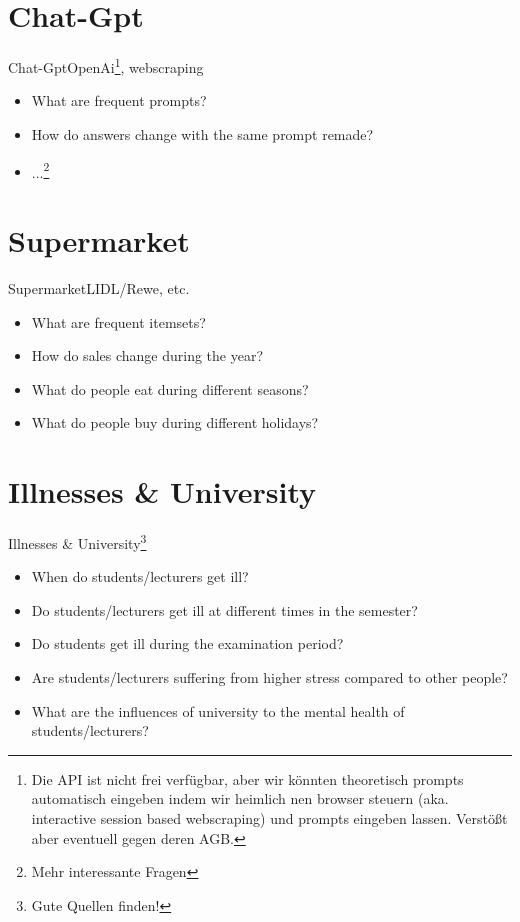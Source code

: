     \section{Chat-Gpt}
    \begin{frame}{Chat-Gpt}{OpenAi\footnote{Die API ist nicht frei verfügbar, aber wir könnten theoretisch prompts automatisch eingeben indem wir heimlich nen  browser steuern (aka. interactive session based webscraping) und prompts eingeben lassen. Verstößt aber eventuell gegen deren AGB.}, webscraping}
        \begin{itemize}[<+->]
            \item What are frequent prompts?
            \item How do answers change with the same prompt remade?
            \item ...\footnote{Mehr interessante Fragen}
        \end{itemize}
    \end{frame}

    \section{Supermarket}
    \begin{frame}{Supermarket}{LIDL/Rewe, etc.}
        \begin{itemize}[<+->]
            \item What are frequent itemsets?
            \item How do sales change during the year?
            \item What do people eat during different seasons?
            \item What do people buy during different holidays?
        \end{itemize}
    \end{frame}

    \section{Illnesses \& University}
    \begin{frame}{Illnesses \& University}{\footnote{Gute Quellen finden!}}
        \begin{itemize}[<+->]
            \item When do students/lecturers get ill?
            \item Do students/lecturers get ill at different times in the semester?
            \item Do students get ill during the examination period?
            \item Are students/lecturers suffering from higher stress compared to other people?
            \item What are the influences of university to the mental health of students/lecturers?
        \end{itemize}
    \end{frame}

